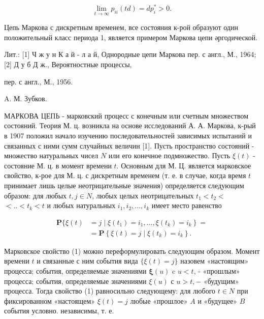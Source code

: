 \documentclass[10pt]{article}
\begin{document}
\[

\lim _{t \rightarrow \infty} p_{i i}(t d)=d p_{i}^{*}>0 .

\]



Цепь Маркова с дискретным временем, все состояния к-рой образуют один положительный класс периода 1, является примером Маркова цепи әргодической.



Лит.: [1] Ч ж у н К а й - л а й, Однородные цепи Маркова пер. с англ., М., 1964; [2] Д у б Д ж., Вероятностные процессы,

пер. с англ., М., 1956.

A. М. Зубков.



МАРКОВА ЦЕПЬ - марковский процесс с конечным или счетным множеством состояний. Теория М. ц. возникла на основе исследований А. А. Маркова, к-рый в 1907 положил начало изучению последовательностей зависимых испытаний и связанных с ними сумм случайных величин [1]. Пусть пространство состояний - множество натуральных чисел $N$ или его конечное подмножество. Пусть $\xi(t)$ - состояние М. ц. в момент времени $t$. Основным для М. Ц. является марковское свойство, к-рое для М. ц. с дискретным временем (т. е. в случае, когда время $t$ принимает лишь целые неотрицательные значения) определяется следующим образом: для любых $t, j \in N$, любых целых неотрицательных $t_{1}<t_{2}<$ $<. .<t_{k}<t$ и любых натуральных $i_{1}, i_{2}, \ldots, i_{k}$ имеет место равенство



\[

\begin{aligned}

\mathbf{P}\{\xi(t) & \left.=j \mid \xi\left(t_{1}\right)=i_{1}, \ldots, \xi\left(t_{k}\right)=i_{k}\right\}= \\

& =\mathbf{P}\left\{\xi(t)=j \mid \xi\left(t_{k}\right)=i_{k}\right\} .

\end{aligned}

\]



Марковское свойство (1) можно переформулировать следующим образом. Момент времени $t$ и связанные с ним события вида $\{\xi(t)=j\}$ назовем «настоящим» процесса; события, определяемые значениями $\boldsymbol{\xi}(u)$ c $u<t$, - «прошлым» процесса; события, определяемые значениями $\xi(u)$ с $u>t,-$ «будущим» процесса. Тогда свойство (1) равносильно следующему: для любого $t \in N$ при фиксированном «настоящем» $\xi(t)=j$ любые «прошлое» $A$ и «будущее» $B$ события условно. независимы, т. е.
\end{document}
